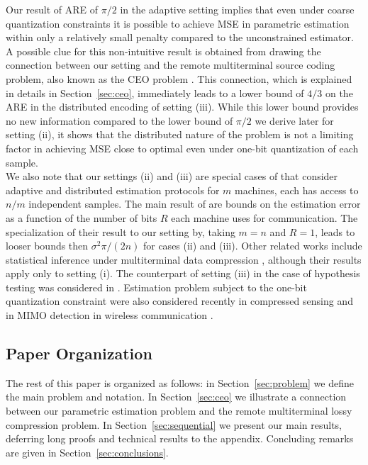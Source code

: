 \documentclass[letterpaper, conference,9pt]{IEEEtran}      %
\begin{document}
Our result of ARE of $\pi/2$ in the adaptive setting implies that even under coarse quantization constraints it is possible to achieve MSE in parametric estimation within only a relatively small penalty compared to the unconstrained estimator. A possible clue for this non-intuitive result is obtained from drawing the connection between our setting and the remote multiterminal source coding problem, also known as the CEO problem \cite{berger1996ceo, viswanathan1997quadratic, oohama1998rate, prabhakaran2004rate}. This connection, which is explained in details in Section~\ref{sec:ceo}, immediately leads to a lower bound of $4/3$ on the ARE in the distributed encoding of setting (iii). While this lower bound provides no new information compared to the lower bound of $\pi /2$ we derive later for setting (ii), it shows that the distributed nature of the problem is not a limiting factor in achieving MSE close to optimal even under one-bit quantization of each sample.\\

We also note that our settings (ii) and (iii) are special cases of 
\cite{zhang2013information} that consider adaptive and distributed estimation protocols for $m$ machines, each has access to $n/m$ independent samples. The main result of \cite{zhang2013information} are bounds on the estimation error as a function of the number of bits $R$ each machine uses for communication. The specialization of their result to our setting by, taking $m=n$ and $R=1$, leads to looser bounds then $\sigma^2\pi/(2n)$ for cases (ii) and (iii). 
Other related works include statistical inference under multiterminal data compression \cite{han1987hypothesis, zhang1988estimation}, although their results apply only to setting (i). The counterpart of setting (iii) in the case of hypothesis testing was considered in \cite{52470}.
%
Estimation problem subject to the one-bit quantization constraint were also considered recently in compressed sensing \cite{boufounos20081,baraniuk2017exponential} and in MIMO detection in wireless communication \cite{singh2009limits}. \\

\subsection*{Paper Organization}

The rest of this paper is organized as follows: in Section~\ref{sec:problem} we define 
the main problem and notation. In Section~\ref{sec:ceo} we illustrate a connection between our parametric estimation problem and the remote multiterminal lossy compression problem. In Section~\ref{sec:sequential} we present our main results, deferring long proofs and technical results to the appendix. Concluding remarks are given in Section~\ref{sec:conclusions}. 
\end{document}
